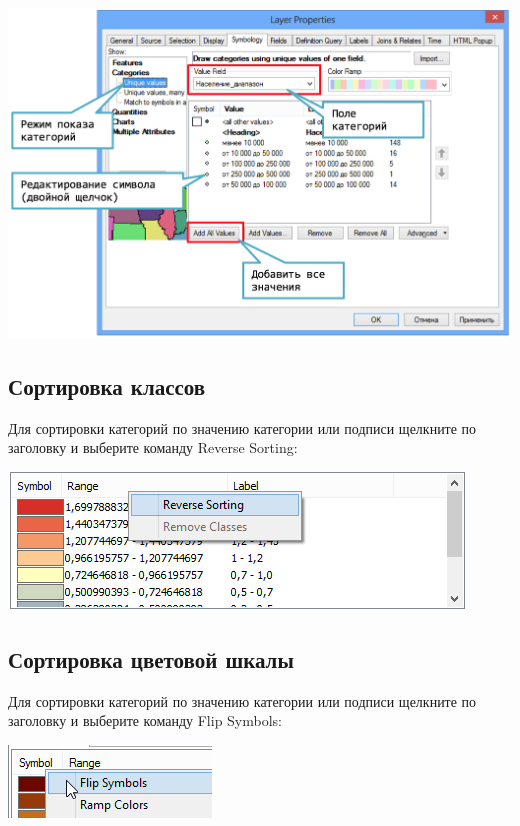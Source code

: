 \documentclass[]{book}
\theoremstyle{definition}
\theoremstyle{definition}
\theoremstyle{definition}
\theoremstyle{remark}
\begin{document}
\includegraphics{images/Appendix/image16.png}

\hypertarget{manual-vector-sorting}{%
\subsection{Сортировка классов}\label{manual-vector-sorting}}

Для сортировки категорий по значению категории или подписи щелкните по
заголовку и выберите команду Reverse Sorting:

\includegraphics{images/Appendix/image17.png}

\hypertarget{manual-vector-colorscale}{%
\subsection{Сортировка цветовой шкалы}\label{manual-vector-colorscale}}

Для сортировки категорий по значению категории или подписи щелкните по
заголовку и выберите команду Flip Symbols:

\includegraphics{images/Appendix/image18.png}
\end{document}
